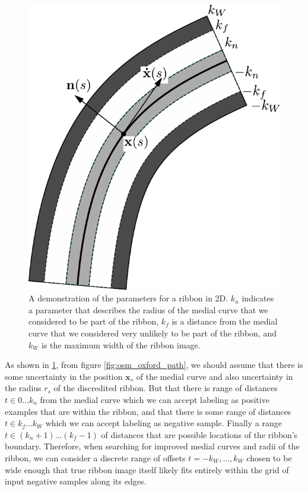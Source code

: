 \begin{figure}[H]
    \centering
    \includegraphics[width=\textwidth]{Figures/sw-figure.pdf}
    \caption[2D Ribbon Image]{A demonstration of the parameters for a ribbon in 2D. $k_n$ indicates a parameter that describes the radius of the medial curve that we considered to be part of the ribbon, $k_f$ is a distance from the medial curve that we considered very unlikely to be part of the ribbon, and $k_W$ is the maximum width of the ribbon image.}
    \label{fig:2d_ribbon}
\end{figure}

As shown in \ref{fig:2d_ribbon}, from figure \ref{fig:osm_oxford_path}, we should assume that there is some uncertainty in the position $\mathbf{x}_s$ of the medial curve and also uncertainty in the radius $r_s$ of the discredited ribbon. 
But that there is range of distances $t \in 0\dots k_n$ from the medial curve which we can accept labeling as positive examples that are within the ribbon, and that there is some range of distances $t \in k_f\dots k_W$ which we can accept labeling as negative sample. 
Finally a range $t\in (k_n+1)...(k_f-1)$ of distances that are possible locations of the ribbon's boundary.
Therefore, when searching for improved medial curves and radii of the ribbon, we can consider a discrete range of offsets $t=-k_W,..., k_W$ chosen to be wide enough that true ribbon image itself likely fits entirely within the grid of input negative samples along its edges.  

